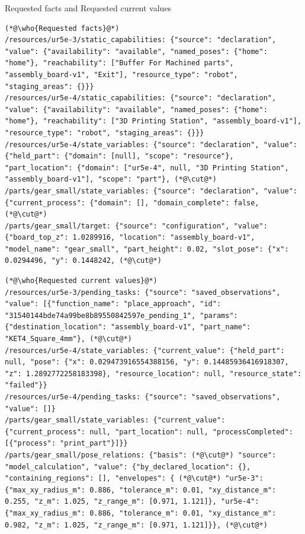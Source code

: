 \begin{recbox}{Requested facts and Requested current values}
\begin{lstlisting}
(*@\who{Requested facts}@*)
/resources/ur5e-3/static_capabilities: {"source": "declaration", "value": {"availability": "available", "named_poses": {"home": "home"}, "reachability": ["Buffer For Machined parts", "assembly_board-v1", "Exit"], "resource_type": "robot", "staging_areas": {}}}
/resources/ur5e-4/static_capabilities: {"source": "declaration", "value": {"availability": "available", "named_poses": {"home": "home"}, "reachability": ["3D Printing Station", "assembly_board-v1"], "resource_type": "robot", "staging_areas": {}}}
/resources/ur5e-4/state_variables: {"source": "declaration", "value": {"held_part": {"domain": [null], "scope": "resource"}, "part_location": {"domain": ["ur5e-4", null, "3D Printing Station", "assembly_board-v1"], "scope": "part"}, (*@\cut@*)
/parts/gear_small/state_variables: {"source": "declaration", "value": {"current_process": {"domain": [], "domain_complete": false, (*@\cut@*)
/parts/gear_small/target: {"source": "configuration", "value": {"board_top_z": 1.0289916, "location": "assembly_board-v1", "model_name": "gear_small", "part_height": 0.02, "slot_pose": {"x": 0.0294496, "y": 0.1448242, (*@\cut@*)
\end{lstlisting}

\vspace{3pt}
\begin{lstlisting}
(*@\who{Requested current values}@*)
/resources/ur5e-3/pending_tasks: {"source": "saved_observations", "value": [{"function_name": "place_approach", "id": "31540144bde74a99be8b89550842597e_pending_1", "params": {"destination_location": "assembly_board-v1", "part_name": "KET4_Square_4mm"}, (*@\cut@*)
/resources/ur5e-4/state_variables: {"current_value": {"held_part": null, "pose": {"x": 0.029473916554388156, "y": 0.14485936416918307, "z": 1.2892772258183398}, "resource_location": null, "resource_state": "failed"}}
/resources/ur5e-4/pending_tasks: {"source": "saved_observations", "value": []}
/parts/gear_small/state_variables: {"current_value": {"current_process": null, "part_location": null, "processCompleted": [{"process": "print_part"}]}}
/parts/gear_small/pose_relations: {"basis": (*@\cut@*) "source": "model_calculation", "value": {"by_declared_location": {}, "containing_regions": [], "envelopes": { (*@\cut@*) "ur5e-3": {"max_xy_radius_m": 0.886, "tolerance_m": 0.01, "xy_distance_m": 0.255, "z_m": 1.025, "z_range_m": [0.971, 1.121]}, "ur5e-4": {"max_xy_radius_m": 0.886, "tolerance_m": 0.01, "xy_distance_m": 0.982, "z_m": 1.025, "z_range_m": [0.971, 1.121]}}, (*@\cut@*)
\end{lstlisting}
\end{recbox}


